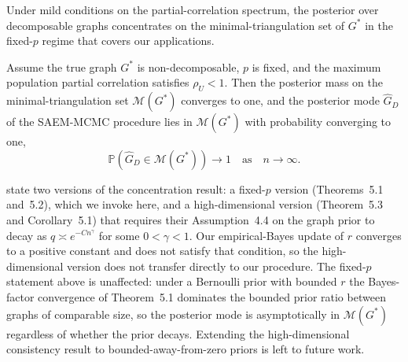Under mild conditions on the partial-correlation spectrum, the posterior over decomposable graphs concentrates on the minimal-triangulation set of $G^*$ in the fixed-$p$ regime that covers our applications.
\begin{theorem}\label{thm:concentration}
Assume the true graph $G^*$ is non-decomposable, $p$ is fixed, and the maximum population partial correlation satisfies $\rho_U < 1$. Then the posterior mass on the minimal-triangulation set $\mathcal{M}(G^*)$ converges to one, and the posterior mode $\hat G_D$ of the SAEM-MCMC procedure lies in $\mathcal{M}(G^*)$ with probability converging to one,
\begin{equation*}
    \mathbb{P}(\hat G_D \in \mathcal{M}(G^*)) \to 1 \quad \text{as} \quad n \to \infty.
\end{equation*}
\end{theorem}
\textcite{niu2020bayesian} state two versions of the concentration result: a fixed-$p$ version (Theorems~5.1 and~5.2), which we invoke here, and a high-dimensional version (Theorem~5.3 and Corollary~5.1) that requires their Assumption~4.4 on the graph prior to decay as $q \asymp e^{-C n^\gamma}$ for some $0 < \gamma < 1$. Our empirical-Bayes update of $r$ converges to a positive constant and does not satisfy that condition, so the high-dimensional version does not transfer directly to our procedure. The fixed-$p$ statement above is unaffected: under a Bernoulli prior with bounded $r$ the Bayes-factor convergence of Theorem~5.1 dominates the bounded prior ratio between graphs of comparable size, so the posterior mode is asymptotically in $\mathcal{M}(G^*)$ regardless of whether the prior decays. Extending the high-dimensional consistency result to bounded-away-from-zero priors is left to future work.

